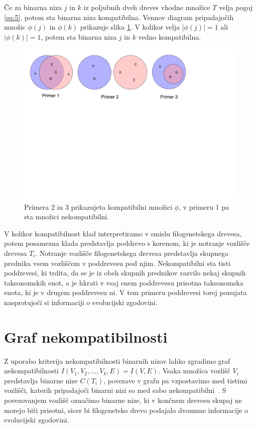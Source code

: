 \documentclass[a4paper, 12pt]{book}
\begin{document}
Če za binarna niza $j$ in $k$ iz poljubnih dveh dreves vhodne množice $T$ velja pogoj \ref{eq:5}, potem sta binarna niza kompatibilna. Vennov diagram pripadajočih množic $\phi(j)$ in $\phi(k)$ prikazuje slika \ref{img-venn-compatibility}. V kolikor velja $\left|\phi(j)\right| = 1$ ali $\left|\phi(k)\right| = 1$, potem sta binarna niza $j$ in $k$ vedno kompatibilna.   

\begin{figure}
	\begin{center}
		\includegraphics[scale=0.54, clip=true, trim=0 15cm 0 0]{gfx/venn-amt-compatibility.pdf}
	\end{center}
	\caption{Primera 2 in 3 prikazujeta kompatibilni množici $\phi$, v primeru 1 pa sta množici nekompatibilni.}
	\label{img-venn-compatibility}
\end{figure}

V kolikor kompatibilnost klad interpretiramo v smislu filogenetskega drevesa, potem posamezna klada predstavlja poddrevo s korenom, ki je notranje vozlišče drevesa $T_i$. Notranje vozlišče filogenetskega drevesa predstavlja skupnega prednika vsem vozliščem v poddrevesu pod njim. Nekompatibilni sta tisti poddrevesi, ki trdita, da se je iz obeh skupnih prednikov razvilo nekaj skupnih taksonomskih enot, a je hkrati v vsaj enem poddrevesu prisotna taksonomska enota, ki je v drugem poddrevesu ni. V tem primeru poddrevesi torej ponujata nasprotujoči si informaciji o evolucijski zgodovini. 

\section{Graf nekompatibilnosti}
Z uporabo kriterija nekompatibilnosti binarnih nizov lahko zgradimo graf nekompatibilnosti $I(V_1, V_2, ..., V_k, E) = I(V, E)$. Vsaka množica vozlišč $V_i$ predstavlja binarne nize $C(T_i)$, povezave v grafu pa vzpostavimo med tistimi vozlišči, katerih pripadajoči binarni nizi so med sabo nekompatibilni~\cite{pw}. S povezovanjem vozlišč označimo binarne nize, ki v končnem drevesu skupaj ne morejo biti prisotni, sicer bi filogenetsko drevo podajalo dvoumne informacije o evolucijski zgodovini. 
\end{document}
